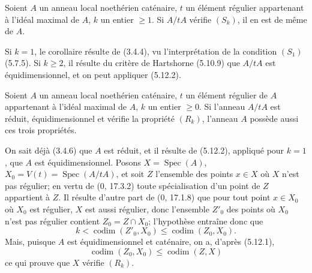 \begin{corollary}[5.12.4]
\label{IV.2.s5.12.4-fr}
Soient $A$ un anneau local noethérien caténaire, $t$ un élément régulier
appartenant à l'idéal maximal de $A$, $k$ un entier $\geq1$. Si $A/tA$
vérifie $(S_k)$, il en est de même de $A$.
\end{corollary}

Si $k=1$, le corollaire résulte de (3.4.4), vu l'interprétation de la condition
$(S_1)$ (5.7.5). Si $k\geq2$, il résulte du critère de Hartshorne (5.10.9) que
$A/tA$ est équidimensionnel, et on peut appliquer (5.12.2).

\begin{proposition}[5.12.5]
\label{IV.2.s5.12.5-fr}
Soient $A$ un anneau local noethérien caténaire, $t$ un élément régulier de $A$
appartenant à l'idéal maximal de $A$, $k$ un entier $\geq0$. Si l'anneau
$A/tA$ est réduit, équidimensionnel et vérifie la propriété $(R_k)$, l'anneau
$A$ possède aussi ces trois propriétés.
\end{proposition}

On sait déjà (3.4.6) que $A$ est réduit, et il résulte de (5.12.2), appliqué
pour $k=1$, que $A$ est équidimensionnel. Posons
$X=\operatorname{Spec}(A)$, $X_0=V(t)=\operatorname{Spec}(A/tA)$, et soit $Z$
l'ensemble des points $x\in X$ où $X$ n'est pas régulier; en vertu de (0,
17.3.2) toute spécialisation d'un point de $Z$ appartient à $Z$. Il résulte
d'autre part de (0, 17.1.8) que pour tout point $x\in X_0$ où $X_0$ est
régulier, $X$ est aussi régulier, donc l'ensemble $Z'_0$ des points où $X_0$
n'est pas régulier contient $Z_0=Z\cap X_0$; l'hypothèse entraîne donc que
\[
k<\operatorname{codim}(Z'_0,X_0)\leq\operatorname{codim}(Z_0,X_0).
\]
Mais, puisque $A$ est équidimensionnel et caténaire, on a, d'après (5.12.1),
\[
\operatorname{codim}(Z_0,X_0)\leq\operatorname{codim}(Z,X)
\]
ce qui prouve que $X$ vérifie $(R_k)$.


